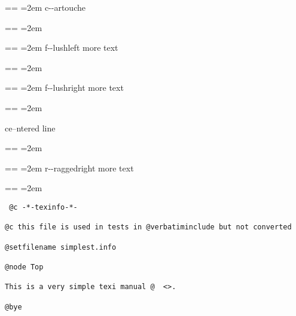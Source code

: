 \documentclass{book}
\makeatletter
\newenvironment{GNUTexinfopreformatted}{%
  \par\obeylines\obeyspaces\frenchspacing
  \parskip=\z@\parindent=\z@}{}
\makeatother
\begin{document}
\begin{mdframed}[style=GNUTexinfocartouche]
\begin{GNUTexinfopreformatted}
\leftskip=2em\relax\ttfamily%
c{-}{-}artouche
\end{GNUTexinfopreformatted}
\end{mdframed}
\begin{GNUTexinfopreformatted}
\leftskip=2em\relax\ttfamily%

\end{GNUTexinfopreformatted}
\begin{GNUTexinfopreformatted}
\leftskip=2em\relax\ttfamily%
f{-}{-}lushleft
more text
\end{GNUTexinfopreformatted}
\begin{GNUTexinfopreformatted}
\leftskip=2em\relax\ttfamily%

\end{GNUTexinfopreformatted}
\begin{GNUTexinfopreformatted}
\leftskip=2em\relax\ttfamily%
f{-}{-}lushright
more text
\end{GNUTexinfopreformatted}
\begin{GNUTexinfopreformatted}
\leftskip=2em\relax\ttfamily%

\end{GNUTexinfopreformatted}
\begin{center}
ce--ntered line
\end{center}
\begin{GNUTexinfopreformatted}
\leftskip=2em\relax\ttfamily%

\end{GNUTexinfopreformatted}
\begin{flushleft}
\begin{GNUTexinfopreformatted}
\leftskip=2em\relax\ttfamily%
r{-}{-}raggedright
more text
\end{GNUTexinfopreformatted}
\end{flushleft}
\begin{GNUTexinfopreformatted}
\leftskip=2em\relax\ttfamily%

\end{GNUTexinfopreformatted}
\begin{verbatim}
 @c -*-texinfo-*-

@c this file is used in tests in @verbatiminclude but not converted

@setfilename simplest.info

@node Top

This is a very simple texi manual @  <>.

@bye
\end{verbatim}
\end{document}
